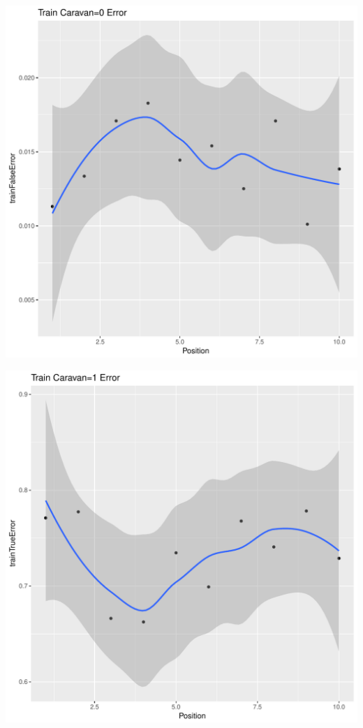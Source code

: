 \documentclass{article}\usepackage[]{graphicx}\usepackage[]{color}
\makeatletter
\def\maxwidth{ %
  \ifdim\Gin@nat@width>\linewidth
    \linewidth
  \else
    \Gin@nat@width
  \fi
}
\newenvironment{kframe}{%
 \def\at@end@of@kframe{}%
 \ifinner\ifhmode%
  \def\at@end@of@kframe{\end{minipage}}%
  \begin{minipage}{\columnwidth}%
 \fi\fi%
 \def\FrameCommand##1{\hskip\@totalleftmargin \hskip-\fboxsep
 \colorbox{shadecolor}{##1}\hskip-\fboxsep
     \hskip-\linewidth \hskip-\@totalleftmargin \hskip\columnwidth}%
 \MakeFramed {\advance\hsize-\width
   \@totalleftmargin\z@ \linewidth\hsize
   \@setminipage}}%
 {\par\unskip\endMakeFramed%
 \at@end@of@kframe}
\newenvironment{knitrout}{}{} %
\makeatother
\begin{document}
\begin{knitrout}
\begin{kframe}
{\ttfamily\noindent\itshape\color{messagecolor}{\#\# `geom\_smooth()` using method = 'loess'}}\end{kframe}
\includegraphics[width=\maxwidth]{figure/unnamed-chunk-35-2} 
\begin{kframe}

{\ttfamily\noindent\itshape\color{messagecolor}{\#\# `geom\_smooth()` using method = 'loess'}}\end{kframe}
\includegraphics[width=\maxwidth]{figure/unnamed-chunk-35-3} 
\begin{kframe}


\end{kframe}
\end{knitrout}
\end{document}
